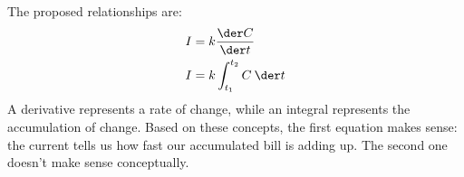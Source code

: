 The proposed relationships are:
\begin{align*}
  I &= k\frac{\der C}{\der t} \\
  I &= k\int_{t_1}^{t_2} C \: \der t
\end{align*}
A derivative represents a rate of change, while an integral
represents the accumulation of change. Based on these concepts,
the first equation makes sense: the current tells us how fast
our accumulated bill is adding up. The second one doesn't
make sense conceptually.
